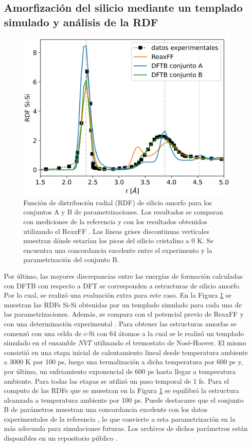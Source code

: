 \subsection{Amorfización del silicio mediante un templado simulado y análisis de la RDF}\label{s:rdfb}

\begin{figure}[h!]
    \centering
    \includegraphics[width=.7\textwidth]{Silicio/modelo/resultados/rdf/rdf.png}
    \caption{Función de distribución radial (RDF) de silicio amorfo para los
    conjuntos A y B de parametrizaciones. Los resultados se comparan con 
    mediciones de la referencia \cite{laaziri1999} y con los resultados obtenidos
    utilizando el ReaxFF \cite{fan2013}. Las líneas grises discontinuas verticales
    muestran dónde estarían los picos del silicio cristalino a 0 K. Se encuentra 
    una concordancia excelente entre el experimento y la parametrización del 
    conjunto B.}
    \label{fig:rdfb}
\end{figure}

Por último, las mayores discrepancias entre las energías de formación calculadas con DFTB
con respecto a DFT se corresponden a estructuras de silicio amorfo. Por lo cual,
se realizó una evaluación extra para este caso. En la Figura \ref{fig:rdfb} se 
muestran las RDFs Si-Si obtenidas por un templado simulado para cada una de las
parametrizaciones. Además, se compara con el potencial previo de ReaxFF 
\cite{fan2013} y con una determinación experimental \cite{laaziri1999}. Para 
obtener las estructuras amorfas se comenzó con una celda de c-Si con 64 átomos 
a la cual se le realizó un templado simulado en el ensamble $NVT$ utilizando el 
termostato de Nosé-Hoover. El mismo consistió en una etapa inicial de 
calentamiento lineal desde temperatura ambiente a 3000 K por 100 ps, luego una
termalización a dicha temperatura por 600 ps y, por último, un enfriamiento 
exponencial de 600 ps hasta llegar a temperatura ambiente. Para todas las etapas
se utilizó un paso temporal de 1 fs. Para el computo de las RDFs que se muestran
en la Figura \ref{fig:rdfb} se equilibró la estructura alcanzada a temperatura 
ambiente por 100 ps. Puede destacarse que el conjunto B de parámetros muestran
una concordancia excelente con los datos experimentales de la referencia 
\cite{laaziri1999}, lo que convierte a esta parametrización en la más adecuada
para simulaciones futuras. Los archivos de dichos parámetros están disponibles
en un repositorio público \cite{dftb_lisi}.
